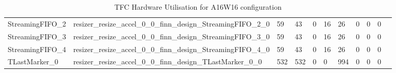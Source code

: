 \begin{landscape}
\begin{table}[!htb]
{\begin{tabular}{l|l|l|l|l|l|l|l|l|l|l}
   StreamingFIFO\_2                                        & resizer\_resize\_accel\_0\_0\_finn\_design\_StreamingFIFO\_2\_0                                        & 59         & 43         & 0       & 16   & 26    & 0      & 0      & 0            \\
   StreamingFIFO\_3                                        & resizer\_resize\_accel\_0\_0\_finn\_design\_StreamingFIFO\_3\_0                                        & 59         & 43         & 0       & 16   & 26    & 0      & 0      & 0            \\
   StreamingFIFO\_4                                        & resizer\_resize\_accel\_0\_0\_finn\_design\_StreamingFIFO\_4\_0                                        & 59         & 43         & 0       & 16   & 26    & 0      & 0      & 0            \\
   TLastMarker\_0                                          & resizer\_resize\_accel\_0\_0\_finn\_design\_TLastMarker\_0\_0                                          & 532        & 532        & 0       & 0    & 994   & 0      & 0      & 0            \\
\end{tabular}
}
\caption[TFC Hardware Utilisation A16W16]{TFC Hardware Utilisation for A16W16 configuration}
  \label{tab:TFCHardwareA16W16}
\end{table}



\end{landscape}
